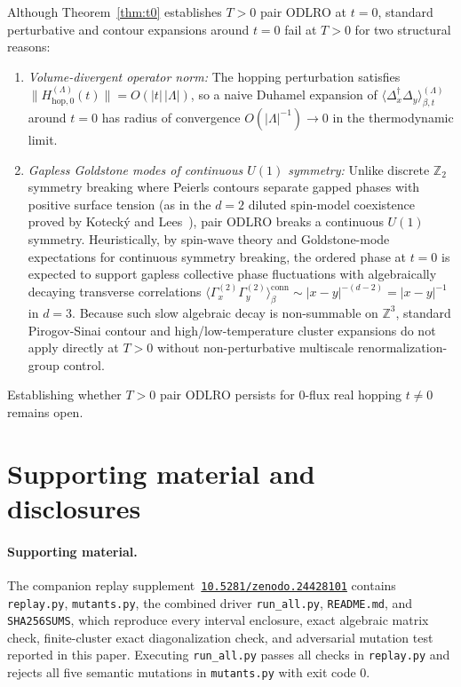 \documentclass[11pt]{article}
\newcommand{\suppdoi}{10.5281/zenodo.24428101}
\newcommand{\DOI}[1]{\edef\doival{#1}\mbox{\href{https://doi.org/\doival}{\expandafter\nolinkurl\expandafter{\doival}}}}
\theoremstyle{definition}
\theoremstyle{remark}
\newcommand{\bbZ}{\mathbb{Z}}
\begin{document}
Although Theorem~\ref{thm:t0} establishes $T > 0$ pair ODLRO at $t = 0$, standard perturbative and contour expansions around $t = 0$ fail at $T > 0$ for two structural reasons:
\begin{enumerate}[label=\arabic*.,leftmargin=2em]
\item \emph{Volume-divergent operator norm:} The hopping perturbation satisfies $\|H_{\mathrm{hop},0}^{(\Lambda)}(t)\| = O(|t|\,|\Lambda|)$, so a naive Duhamel expansion of $\langle \Delta_x^\dagger \Delta_y \rangle_{\beta,t}^{(\Lambda)}$ around $t = 0$ has radius of convergence $O(|\Lambda|^{-1}) \to 0$ in the thermodynamic limit.
\item \emph{Gapless Goldstone modes of continuous $U(1)$ symmetry:} Unlike discrete $\bbZ_2$ symmetry breaking where Peierls contours separate gapped phases with positive surface tension (as in the $d = 2$ diluted spin-model coexistence proved by Koteck\'y and Lees~\cite{kotecky2019}), pair ODLRO breaks a continuous $U(1)$ symmetry. Heuristically, by spin-wave theory and Goldstone-mode expectations for continuous symmetry breaking, the ordered phase at $t = 0$ is expected to support gapless collective phase fluctuations with algebraically decaying transverse correlations $\langle \Gamma_x^{(2)}\Gamma_y^{(2)}\rangle_\beta^{\mathrm{conn}} \sim |x - y|^{-(d-2)} = |x - y|^{-1}$ in $d = 3$. Because such slow algebraic decay is non-summable on $\bbZ^3$, standard Pirogov-Sinai contour and high/low-temperature cluster expansions do not apply directly at $T > 0$ without non-perturbative multiscale renormalization-group control.
\end{enumerate}
Establishing whether $T > 0$ pair ODLRO persists for $0$-flux real hopping $t \ne 0$ remains open.

\section{Supporting material and disclosures}\label{sec:supp}

\paragraph{Supporting material.}
The companion replay supplement~\DOI{\suppdoi} contains \texttt{replay.py}, \texttt{mutants.py}, the combined driver \texttt{run\_all.py}, \texttt{README.md}, and \texttt{SHA256SUMS}, which reproduce every interval enclosure, exact algebraic matrix check, finite-cluster exact diagonalization check, and adversarial mutation test reported in this paper. Executing \texttt{run\_all.py} passes all checks in \texttt{replay.py} and rejects all five semantic mutations in \texttt{mutants.py} with exit code $0$.
\end{document}

